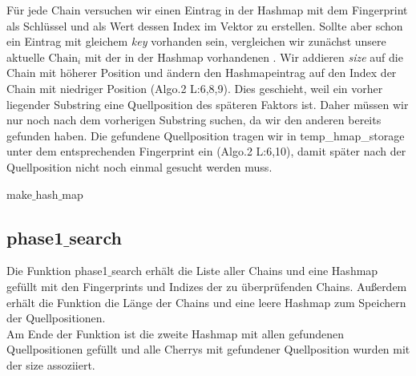 \noindent
Für jede Chain versuchen wir einen Eintrag in der Hashmap mit dem Fingerprint als Schlüssel und als Wert dessen Index im Vektor zu erstellen. Sollte aber schon ein Eintrag mit gleichem \textit{key} vorhanden sein, vergleichen wir zunächst unsere aktuelle $\text{Chain}_i$ mit der in der Hashmap vorhandenen . 
Wir addieren \textit{size} auf die Chain mit höherer Position und ändern den Hashmapeintrag auf den Index der Chain mit niedriger Position (Algo.2 L:6,8,9). Dies geschieht, weil ein vorher liegender Substring  eine Quellposition des späteren Faktors ist. Daher müssen wir nur noch nach dem vorherigen Substring suchen, da wir den anderen bereits gefunden haben.
Die gefundene Quellposition tragen wir in temp\_hmap\_storage unter dem entsprechenden Fingerprint ein (Algo.2 L:6,10), damit später nach der Quellposition nicht noch einmal gesucht werden muss.
\begin{algorithm}[ht!]
	\caption{make$\_$hash$\_$map}
	\label{makehash}
\end{algorithm}


\subsection{phase1$\_$search}
Die Funktion phase1$\_$search erhält die Liste aller Chains und eine Hashmap gefüllt mit den Fingerprints und  Indizes der zu überprüfenden Chains. Außerdem erhält die Funktion die Länge der Chains und eine leere Hashmap zum Speichern der Quellpositionen.\\
Am Ende der Funktion ist die zweite Hashmap mit allen gefundenen Quellpositionen gefüllt und alle Cherrys mit gefundener Quellposition wurden mit der size assoziiert.\\

